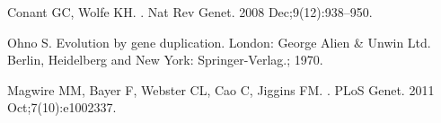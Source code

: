 


  \vspace*{0.2in}
  \begin{flushleft}
    
    
  \end{flushleft}
  

  \linenumbers

  
  
  
  
  
  
  

  \nolinenumbers


  \begin{thebibliography}{10}
    Conant GC, Wolfe KH.
    .
    \newblock Nat Rev Genet. 2008 Dec;9(12):938--950.

    Ohno S.
    \newblock Evolution by gene duplication.
    \newblock London: George Alien \& Unwin Ltd. Berlin, Heidelberg and New York:
      Springer-Verlag.; 1970.

    Magwire MM, Bayer F, Webster CL, Cao C, Jiggins FM.
    .
    \newblock PLoS Genet. 2011 Oct;7(10):e1002337.

  \end{thebibliography}


